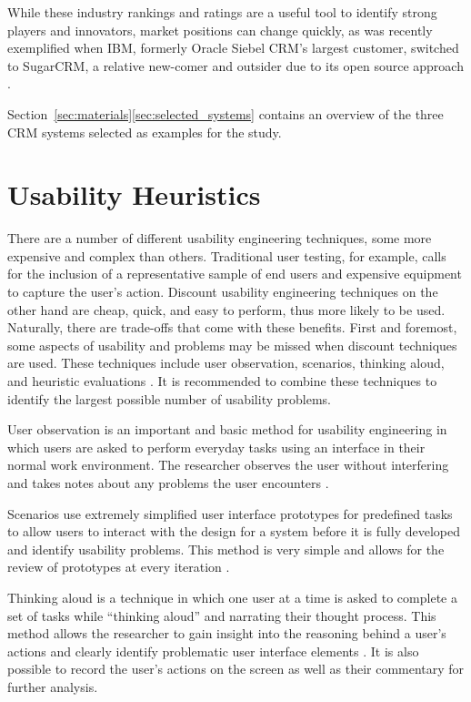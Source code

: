 While these industry rankings and ratings are a useful tool to identify strong players and innovators, market positions can change quickly, as was recently exemplified when IBM, formerly Oracle Siebel CRM's largest customer, switched to SugarCRM, a relative new-comer and outsider due to its open source approach \citep{Jones2012}.

Section~\ref{sec:materials}\ref{sec:selected_systems} contains an overview of the three CRM systems selected as examples for the study.

\section{Usability Heuristics}
\label{sec:heuristics_review}
There are a number of different usability engineering techniques, some more expensive and complex than others. Traditional user testing, for example, calls for the inclusion of a representative sample of end users and expensive equipment to capture the user's action. Discount usability engineering techniques \citep{Nielsen1993} on the other hand are cheap, quick, and easy to perform, thus more likely to be used. Naturally, there are trade-offs that come with these benefits. First and foremost, some aspects of usability and problems may be missed when discount techniques are used. These techniques include user observation, scenarios, thinking aloud, and heuristic evaluations \citep{Nielsen1993}. It is recommended to combine these techniques to identify the largest possible number of usability problems.

User observation is an important and basic method for usability engineering in which users are asked to perform everyday tasks using an interface in their normal work environment. The researcher observes the user without interfering and takes notes about any problems the user encounters \citep{Nielsen1993}.

Scenarios use extremely simplified user interface prototypes for predefined tasks to allow users to interact with the design for a system before it is fully developed and identify usability problems. This method is very simple and allows for the review of prototypes at every iteration \citep{Nielsen1993}.

Thinking aloud is a technique in which one user at a time is asked to complete a set of tasks while ``thinking aloud'' and narrating their thought process. This method allows the researcher to gain insight into the reasoning behind a user's actions and clearly identify problematic user interface elements \citep{Nielsen1993}. It is also possible to record the user's actions on the screen as well as their commentary for further analysis.

